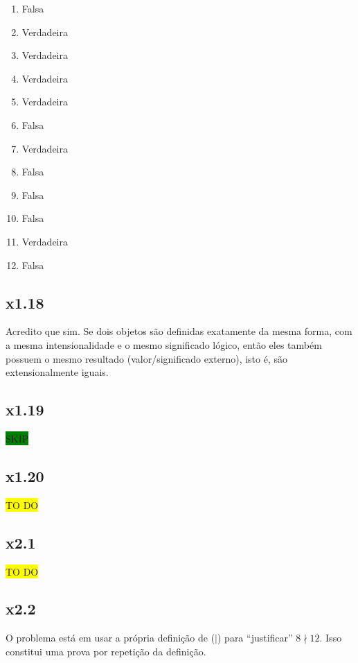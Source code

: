 \documentclass[portuguese,a4paper,12pt]{article}
\begin{document}
	\begin{enumerate}[label=(\roman*)]
		\item Falsa
		\item Verdadeira
		\item Verdadeira
		\item Verdadeira
		\item Verdadeira
		\item Falsa
		\item Verdadeira
		\item Falsa
		\item Falsa
		\item Falsa
		\item Verdadeira
		\item Falsa
	\end{enumerate}
	
	\subsection*{x1.18}
	
	Acredito que sim. Se dois objetos são definidas exatamente da mesma forma, com a mesma intensionalidade e o mesmo significado lógico, então eles também possuem o mesmo resultado (valor/significado externo), isto é, são extensionalmente iguais.
	
	\subsection*{x1.19}
	
	\colorbox{green}{SKIP}
	
	\subsection*{x1.20}
	
	\colorbox{yellow}{TO DO}
	
	\subsection*{x2.1}
	
	\colorbox{yellow}{TO DO}
	
	\subsection*{x2.2}
	
	O problema está em usar a própria definição de ($\mid$) para ``justificar'' $8 \nmid 12$. Isso constitui uma prova por repetição da definição.
	
\end{document}

